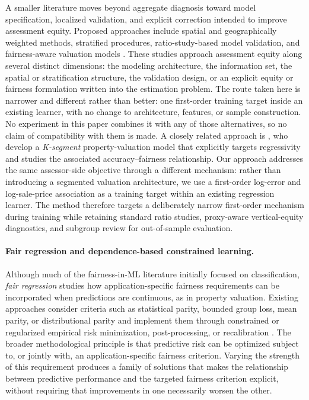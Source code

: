 \documentclass[10pt]{article}
\theoremstyle{definition}
\newcommand{\1}{\mathbf{1}}
\begin{document}
{A smaller literature moves beyond aggregate diagnosis toward model specification, localized validation, and explicit correction intended to improve assessment equity.} Proposed approaches include spatial and geographically weighted methods, stratified procedures, ratio-study-based model validation, and fairness-aware valuation models \cite{Quintos2014,BidansetEtAl2019,BidansetEtAl2025,HermansEtAl2022,HermansEtAl2025,CandoganHanLu2023}. These studies approach assessment equity along several distinct dimensions: the modeling architecture, the information set, the spatial or stratification structure, the validation design, or an explicit equity or fairness formulation written into the estimation problem. The route taken here is narrower and different rather than better: one first-order training target inside an existing learner, with no change to architecture, features, or sample construction. No experiment in this paper combines it with any of those alternatives, so no claim of compatibility with them is made.
{A closely related approach is \textcite{CandoganHanLu2023}, who develop a \emph{K-segment} property-valuation model that explicitly targets regressivity and studies the associated accuracy--fairness relationship. Our approach addresses the same assessor-side objective through a different mechanism: rather than introducing a segmented valuation architecture, we use a first-order log-error and log-sale-price association as a training target within an existing regression learner. The method therefore targets a deliberately narrow first-order mechanism during training while retaining standard ratio studies, proxy-aware vertical-equity diagnostics, and subgroup review for out-of-sample evaluation.}

\paragraph{Fair regression and dependence-based constrained learning.}


Although much of the fairness-in-ML literature initially focused on classification, \emph{fair regression} studies how application-specific fairness requirements can be incorporated when predictions are continuous, as in property valuation. Existing approaches consider criteria such as statistical parity, bounded group loss, mean parity, or distributional parity and implement them through constrained or regularized empirical risk minimization, post-processing, or recalibration \cite{AgarwalDudikWu2019,FitzsimonsEtAl2019,ChzhenEtAl2020Wasserstein,ChzhenEtAl2020Recalibration,WeiEtAl2023}. The broader methodological principle is that predictive risk can be optimized subject to, or jointly with, an application-specific fairness criterion. Varying the strength of this requirement produces a family of solutions that makes the relationship between predictive performance and the targeted fairness criterion explicit, without requiring that improvements in one necessarily worsen the other.
\end{document}
